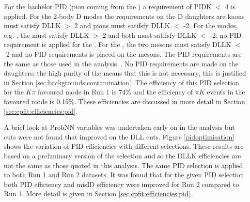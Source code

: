 For the bachelor PID (pion coming from the \Kstarm) a requirement of PIDK $<$ 4 is applied. For the 2-body D modes the requirements on the D daughters are kaons must satisfy DLLK $>$ 2 and pions must satifsfy DLLK $<$ -2. For the  modes, e.g. \decay{\Dz}{\Km\pip\pim\pip}, the \Km must satisfy DLLK $>$ 2 and both \pip must satifsfy DLLK $<$ -2; no PID requirement is applied for the \pip. For the \decay{\Dz}{\pip\pim\pip\pim}, the two \pip mesons must satisfy DLLK $<$ -2 and no PID requirements is placed on the \pim mesons. The PID requirements are the same as those used in the \decay{\Bp}{\D\Kp} analysis~\cite{LHCb-PAPER-2016-003}. No PID requirements are made on the \KS daughters; the high purity of the \KS means that this is not necessary, this is justified in Section \ref{sec:backgrounds:contamination}. The efficiency of this PID selection for the $K\pi$ favoured mode in Run 1 is 74\% and the efficiency of $\pi K$ events in the favoured mode is 0.15\%. These efficiencies are discussed in more detail in Section \ref{sec:cpfit:efficiencies:pid}. 


A brief look at ProbNN variables was undertaken early on in the analysis but cuts were not found that improved on the DLL cuts. Figure \ref{pidoptimisation} shows the variation of PID efficiencies with different selections. These results are based on a preliminary version of the selection and so the DLLK efficiencies are not the same as those quoted in this analysis.  The same PID selection is applied to both Run 1 and Run 2 datasets. It was found that for the given PID selection both PID efficiency and misID efficiency were improved for Run 2 compared to Run 1. More detail is given in Section \ref{sec:cpfit:efficiencies:pid}.

